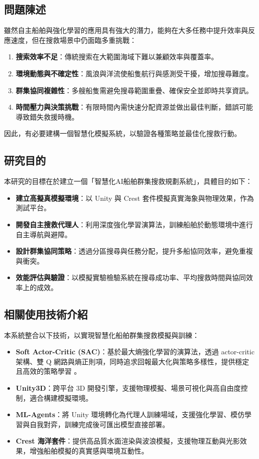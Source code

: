 \documentclass[12pt,a4paper]{article}
\begin{document}
\subsection{問題陳述}
雖然自主船舶與強化學習的應用具有強大的潛力，能夠在大多任務中提升效率與反應速度，但在搜救場景中仍面臨多重挑戰\cite{KilicChallenge}\cite{KilicRL}\cite{NOAA}：

\begin{enumerate}
\item \textbf{搜索效率不足}：傳統搜索在大範圍海域下難以兼顧效率與覆蓋率。
\item \textbf{環境動態與不確定性}：風浪與洋流使船隻航行與感測受干擾，增加搜尋難度\cite{IAMSAR2008}。
\item \textbf{群集協同複雜性}：多艘船隻需避免搜尋範圍重疊、確保安全並即時共享資訊\cite{IAMSAR2008}。
\item \textbf{時間壓力與決策挑戰}：有限時間內需快速分配資源並做出最佳判斷，錯誤可能導致錯失救援時機。
\end{enumerate}

因此，有必要建構一個智慧化模擬系統，以驗證各種策略並最佳化搜救行動。

\subsection{研究目的}
本研究的目標在於建立一個「智慧化AI船舶群集搜救規劃系統」，具體目的如下：

\begin{itemize}
\item \textbf{建立高擬真模擬環境}：以 Unity 與 Crest 套件模擬真實海象與物理效果，作為測試平台。
\item \textbf{開發自主搜救代理人}：利用深度強化學習演算法，訓練船舶於動態環境中進行自主導航與避障。
\item \textbf{設計群集協同策略}：透過分區搜尋與任務分配，提升多船協同效率，避免重複與衝突。
\item \textbf{效能評估與驗證}：以模擬實驗檢驗系統在搜尋成功率、平均搜救時間與協同效率上的成效。
\end{itemize}

\subsection{相關使用技術介紹}

本系統整合以下技術，以實現智慧化船舶群集搜救模擬與訓練：

\begin{itemize}
	\item \textbf{Soft Actor-Critic (SAC)}：基於最大熵強化學習的演算法，透過 actor-critic 架構、雙 Q 網路與熵正則項，同時追求回報最大化與策略多樣性，提供穩定且高效的策略學習 \cite{Atari}\cite{SAC}。
	\item \textbf{Unity3D}：跨平台 3D 開發引擎，支援物理模擬、場景可視化與高自由度控制，適合構建模擬環境。
	\item \textbf{ML-Agents}：將 Unity 環境轉化為代理人訓練場域，支援強化學習、模仿學習與自我對弈，訓練完成後可匯出模型直接部署\cite{MLAgentRepo}。
	 \item \textbf{Crest 海洋套件}：提供高品質水面渲染與波浪模擬，支援物理互動與光影效果，增強船舶模擬的真實感與環境互動性\cite{CrestIntro}。
\end{itemize}
\end{document}
